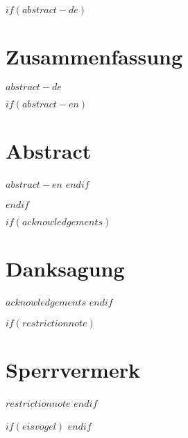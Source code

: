 
$if(abstract-de)$
\cleardoublepage
\begin{minipage}{\linewidth}

\chapter*{Zusammenfassung}
$abstract-de$

$if(abstract-en)$
\chapter*{Abstract}
$abstract-en$
$endif$

\end{minipage}
\cleardoublepage
$endif$



$if(acknowledgements)$
\chapter*{Danksagung}
$acknowledgements$
$endif$



$if(restrictionnote)$
\chapter*{Sperrvermerk}
$restrictionnote$
$endif$



$if(eisvogel)$
\cleardoublepage
\pagestyle{eisvogel-header-footer}
$endif$
